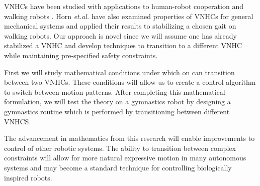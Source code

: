 \documentclass[a4paper,12pt]{article}
\begin{document}
VNHCs have been studied with applications to human-robot cooperation
\cite{vnhc-human-robot-coop} and walking robots \cite{vnhc-biped-robot}. Horn
\textit{et.al.} \cite{hybrid_zero_dynamics_bipedal_nhvcs} have also examined
properties of VNHCs for general mechanical systems and applied their results to
stabilizing a chosen gait on walking robots. Our approach is novel since we will
assume one has already stabilized a VNHC and develop techniques to transition to
a different VNHC while maintaining pre-specified safety constraints.

First we will study mathematical conditions under which on can transition
between two VNHCs. These conditions will allow us to create a control algorithm
to switch between motion patterns. After completing this mathematical
formulation, we will test the theory on a gymnastics robot by designing a
gymnastics routine which is performed by transitioning between different VNHCS. 

The advancement in mathematics from this research will enable improvements to
control of other robotic systems. The ability to transition between complex
constraints will allow for more natural expressive motion in many autonomous
systems and may become a standard technique for controlling biologically
inspired robots.

\printbibliography
\end{document}
